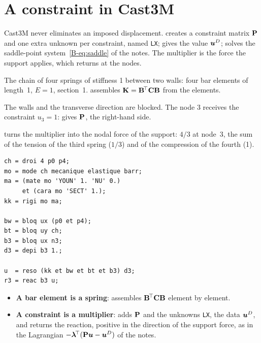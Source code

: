 \section{A constraint in Cast3M}\label{cc:sec1-bloq}
%
Cast3M never eliminates an imposed displacement.  creates a
constraint matrix $\mathbf{P}$ and one extra unknown per constraint, named
\texttt{LX};  gives the value $\bm{u}^{D}$;  solves the
saddle-point system~\eqref{B-eq:saddle} of the notes. The multiplier is the
force the support applies, which  returns at the nodes.
\begin{castemcom}
The chain of four springs of stiffness 1 between two walls: four bar
elements of length~1, $E=1$, section~1.  assembles
$\mathbf{K}=\mathbf{B}^{\!\top}\mathbf{C}\mathbf{B}$ from the elements.

The walls and the transverse direction are blocked. The node 3 receives the
constraint $u_3=1$:  gives $\mathbf{P}$,  the right-hand side.

 turns the multiplier into the nodal force of the support: $4/3$ at
node~3, the sum of the tension of the third spring ($1/3$) and of the
compression of the fourth (1).
\end{castemcom}
\begin{castemlines}
\begin{verbatim}
ch = droi 4 p0 p4;
mo = mode ch mecanique elastique barr;
ma = (mate mo 'YOUN' 1. 'NU' 0.)
     et (cara mo 'SECT' 1.);
kk = rigi mo ma;

bw = bloq ux (p0 et p4);
bt = bloq uy ch;
b3 = bloq ux n3;
d3 = depi b3 1.;

u  = reso (kk et bw et bt et b3) d3;
r3 = reac b3 u;
\end{verbatim}
\end{castemlines}


\begin{gbox*}
\begin{itemize}
\item \textbf{A bar element is a spring}:  assembles
  $\mathbf{B}^{\!\top}\mathbf{C}\mathbf{B}$ element by element.
\item \textbf{A constraint is a multiplier}:  adds $\mathbf{P}$ and the
  unknowns \texttt{LX},  the data $\bm{u}^{D}$, and  returns the
  reaction, positive in the direction of the support force, as in the
  Lagrangian $-\boldsymbol\lambda^{\!\top}(\mathbf{P}\bm{u}-\bm{u}^{D})$ of the notes.
\end{itemize}
\end{gbox*}

